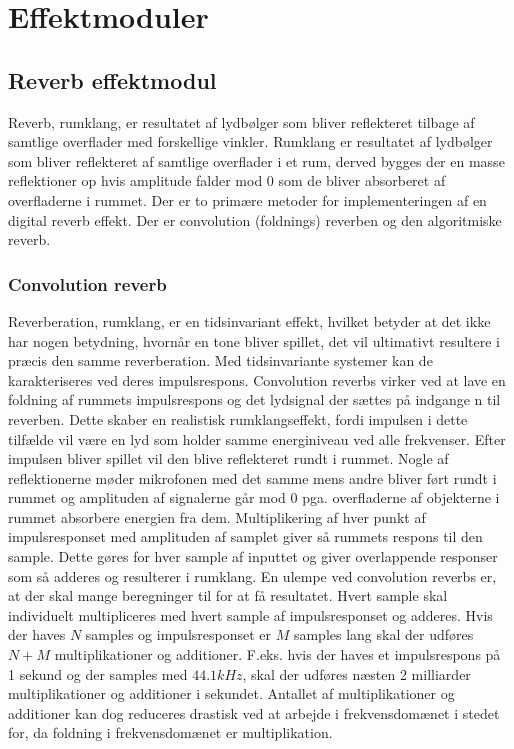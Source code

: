 \chapter{Effektmoduler}\label{chap:DSP}


\section{Reverb effektmodul}\label{sec:reverb}
Reverb, rumklang, er resultatet af lydbølger som bliver reflekteret tilbage af samtlige overflader med forskellige vinkler.\newline
Rumklang er resultatet af lydbølger som bliver reflekteret af samtlige overflader i et rum, derved bygges der en masse reflektioner op hvis amplitude falder mod $0$ som de bliver absorberet af overfladerne i rummet.\newline
Der er to primære metoder for implementeringen af en digital reverb effekt.
Der er convolution (foldnings) reverben og den algoritmiske reverb.
\subsection{Convolution reverb}
Reverberation, rumklang, er en tidsinvariant effekt, hvilket betyder at det ikke har nogen betydning, hvornår en tone bliver spillet, det vil ultimativt resultere i præcis den samme reverberation. \newline
Med tidsinvariante systemer kan de karakteriseres ved deres impulsrespons.
Convolution reverbs virker ved at lave en foldning af rummets impulsrespons og det lydsignal der sættes på indgange n til reverben.\newline
Dette skaber en realistisk rumklangseffekt, fordi impulsen i dette tilfælde vil være en lyd som holder samme energiniveau ved alle frekvenser.
Efter impulsen bliver spillet vil den blive reflekteret rundt i rummet.
Nogle af reflektionerne møder mikrofonen med det samme mens andre bliver ført rundt i rummet og amplituden af signalerne går mod $0$ pga. overfladerne af objekterne i rummet absorbere energien fra dem.\newline
Multiplikering af hver punkt af impulsresponset med amplituden af samplet giver så rummets respons til den sample.
Dette gøres for hver sample af inputtet og giver overlappende responser som så adderes og resulterer i rumklang.
En ulempe ved convolution reverbs er, at der skal mange beregninger til for at få resultatet.
Hvert sample skal individuelt multipliceres med hvert sample af impulsresponset og adderes.
Hvis der haves $N$ samples og impulsresponset er $M$ samples lang skal der udføres $N+M$ multiplikationer og additioner.
F.eks. hvis der haves et impulsrespons på 1 sekund og der samples med $44.1\si{kHz}$, skal der udføres næsten 2 milliarder multiplikationer og additioner i sekundet.
Antallet af multiplikationer og additioner kan dog reduceres drastisk ved at arbejde i frekvensdomænet i stedet for, da foldning i frekvensdomænet er multiplikation.

